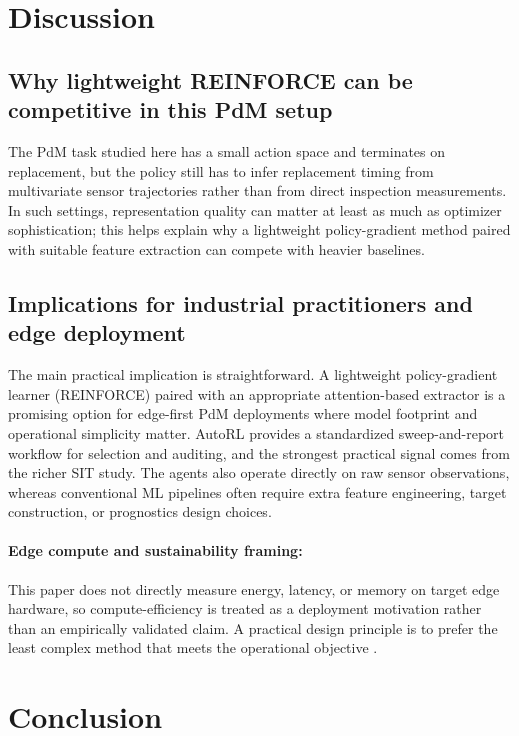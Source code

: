 \documentclass[sn-vancouver-num]{sn-jnl}%
\begin{document}
\section{Discussion}
\label{sec:discussion}
\subsection{Why lightweight REINFORCE can be competitive in this PdM setup}
The PdM task studied here has a small action space and terminates on replacement, but the policy still has to infer replacement timing from multivariate sensor trajectories rather than from direct inspection measurements. In such settings, representation quality can matter at least as much as optimizer sophistication; this helps explain why a lightweight policy-gradient method paired with suitable feature extraction can compete with heavier baselines.

\subsection{Implications for industrial practitioners and edge deployment}
The main practical implication is straightforward. A lightweight policy-gradient learner (\textsc{REINFORCE}) paired with an appropriate attention-based extractor is a promising option for edge-first PdM deployments where model footprint and operational simplicity matter. AutoRL provides a standardized sweep-and-report workflow for selection and auditing, and the strongest practical signal comes from the richer SIT study. The agents also operate directly on raw sensor observations, whereas conventional ML pipelines often require extra feature engineering, target construction, or prognostics design choices.

\paragraph{Edge compute and sustainability framing:}
This paper does not directly measure energy, latency, or memory on target edge hardware, so compute-efficiency is treated as a deployment motivation rather than an empirically validated claim. A practical design principle is to prefer the least complex method that meets the operational objective \cite{Schwartz2020, Strubell2019}.


\section{Conclusion}
\label{sec:conclusion}
\end{document}
